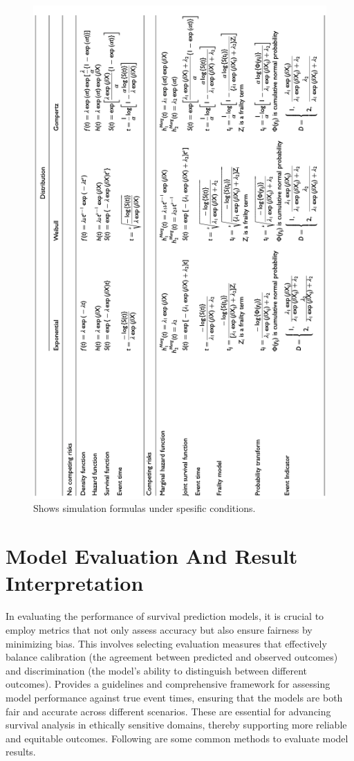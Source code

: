 \begin{figure}[h]
    \centering
    \includegraphics[scale=0.56 , angle=270]{Figures/COMPETING1.png}
    \caption{\parencite{meng_simulating_2023} Shows simulation formulas under spesific conditions.}
\end{figure}
\section{Model Evaluation And Result Interpretation} \label{eval}
In evaluating the performance of survival prediction models, it is crucial to employ metrics that not only assess accuracy but also ensure fairness by minimizing bias. This involves selecting evaluation measures that effectively balance calibration (the agreement between predicted and observed outcomes) and discrimination (the model's ability to distinguish between different outcomes). \parencite{sonabend_flexible_2022} Provides a guidelines and comprehensive framework for assessing model performance against true event times, ensuring that the models are both fair and accurate across different scenarios. These are essential for advancing survival analysis in ethically sensitive domains, thereby supporting more reliable and equitable outcomes. Following are some common methods to evaluate model results.

